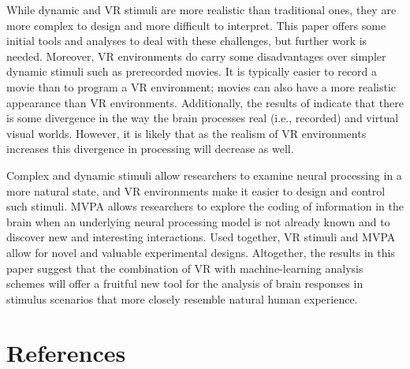 \documentclass[5p,authoryear]{elsarticle}
\begin{document}
While dynamic and VR stimuli are more realistic than traditional ones, they are more complex to design and more difficult to interpret.
This paper offers some initial tools and analyses to deal with these challenges, but further work is needed.
Moreover, VR environments do carry some disadvantages over simpler dynamic stimuli such as prerecorded movies. 
It is typically easier to record a movie than to program a VR environment; movies can also have a more realistic appearance than VR environments.
Additionally, the results of \cite{Han2005} indicate that there is some divergence in the way the brain processes real (i.e., recorded) and virtual visual worlds. 
However, it is likely that as the realism of VR environments increases this divergence in processing will decrease as well.

Complex and dynamic stimuli allow researchers to examine neural processing in a more natural state, and VR environments make it easier to design and control such stimuli.
MVPA allows researchers to explore the coding of information in the brain when an underlying neural processing model is not already known and to discover new and interesting interactions.
Used together, VR stimuli and MVPA allow for novel and valuable experimental designs.
Altogether, the results in this paper suggest that the combination of VR with machine-learning analysis schemes will offer a fruitful new tool for the analysis of brain responses in stimulus scenarios that more closely resemble natural human experience.

\section{References}

\end{document}
